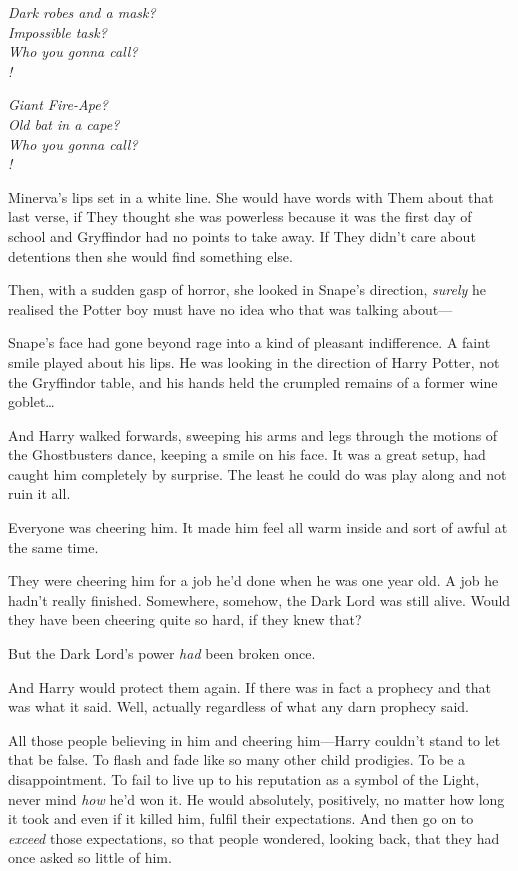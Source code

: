 \begin{center}
\emph{Dark robes and a mask?\\
Impossible task?\\
Who you gonna call?\\
!}

\emph{Giant Fire-Ape?\\
Old bat in a cape?\\
Who you gonna call?\\
!}
\end{center}

Minerva’s lips set in a white line. She would have words with Them about that last verse, if They thought she was powerless because it was the first day of school and Gryffindor had no points to take away. If They didn’t care about detentions then she would find something else.

Then, with a sudden gasp of horror, she looked in Snape’s direction, \emph{surely} he realised the Potter boy must have no idea who that was talking about—

Snape’s face had gone beyond rage into a kind of pleasant indifference. A faint smile played about his lips. He was looking in the direction of Harry Potter, not the Gryffindor table, and his hands held the crumpled remains of a former wine goblet…

And Harry walked forwards, sweeping his arms and legs through the motions of the Ghostbusters dance, keeping a smile on his face. It was a great setup, had caught him completely by surprise. The least he could do was play along and not ruin it all.

Everyone was cheering him. It made him feel all warm inside and sort of awful at the same time.

They were cheering him for a job he’d done when he was one year old. A job he hadn’t really finished. Somewhere, somehow, the Dark Lord was still alive. Would they have been cheering quite so hard, if they knew that?

But the Dark Lord’s power \emph{had} been broken once.

And Harry would protect them again. If there was in fact a prophecy and that was what it said. Well, actually regardless of what any darn prophecy said.

All those people believing in him and cheering him—Harry couldn’t stand to let that be false. To flash and fade like so many other child prodigies. To be a disappointment. To fail to live up to his reputation as a symbol of the Light, never mind \emph{how} he’d won it. He would absolutely, positively, no matter how long it took and even if it killed him, fulfil their expectations. And then go on to \emph{exceed} those expectations, so that people wondered, looking back, that they had once asked so little of him.

